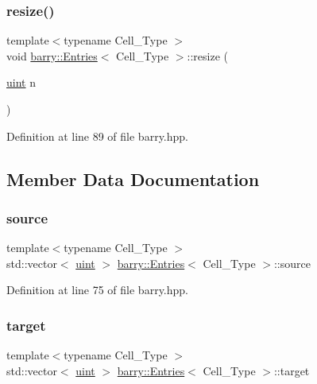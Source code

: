 \subsubsection{\texorpdfstring{resize()}{resize()}}
{\footnotesize\ttfamily template$<$typename Cell\+\_\+\+Type $>$ \\
void \hyperlink{classbarry_1_1_entries}{barry\+::\+Entries}$<$ Cell\+\_\+\+Type $>$\+::resize (\begin{DoxyParamCaption}\item[{\hyperlink{namespacebarry_a11dfc53ddb4672278319aa04f1e09a6c}{uint}}]{n }\end{DoxyParamCaption})\hspace{0.3cm}{\ttfamily [inline]}}



Definition at line 89 of file barry.\+hpp.



\subsection{Member Data Documentation}
\mbox{\label{classbarry_1_1_entries_a5992282ca5f39dbbbd4195d7176b6295}} 
\subsubsection{\texorpdfstring{source}{source}}
{\footnotesize\ttfamily template$<$typename Cell\+\_\+\+Type $>$ \\
std\+::vector$<$ \hyperlink{namespacebarry_a11dfc53ddb4672278319aa04f1e09a6c}{uint} $>$ \hyperlink{classbarry_1_1_entries}{barry\+::\+Entries}$<$ Cell\+\_\+\+Type $>$\+::source}



Definition at line 75 of file barry.\+hpp.

\mbox{\label{classbarry_1_1_entries_a07de39535af23bc1f9e3918b32a39b18}} 
\subsubsection{\texorpdfstring{target}{target}}
{\footnotesize\ttfamily template$<$typename Cell\+\_\+\+Type $>$ \\
std\+::vector$<$ \hyperlink{namespacebarry_a11dfc53ddb4672278319aa04f1e09a6c}{uint} $>$ \hyperlink{classbarry_1_1_entries}{barry\+::\+Entries}$<$ Cell\+\_\+\+Type $>$\+::target}



